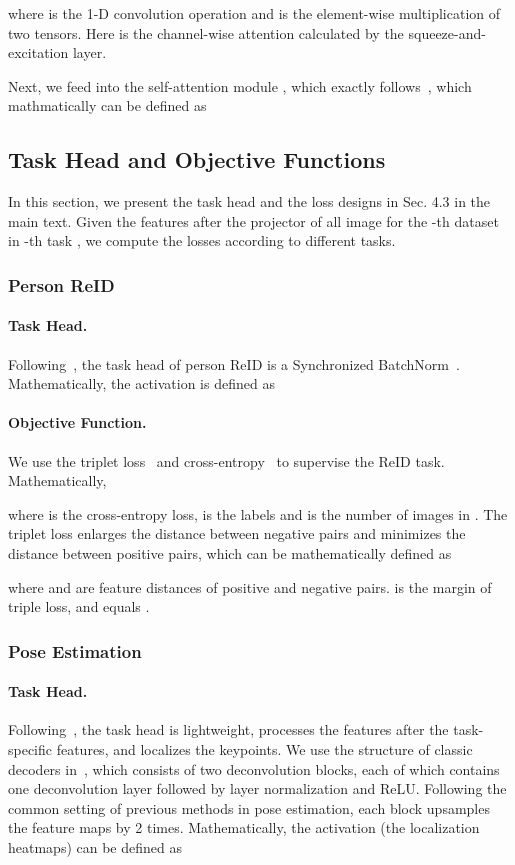 \documentclass[10pt,twocolumn,letterpaper]{article}
\begin{document}
where  is the 1-D convolution operation and  is the element-wise multiplication of two tensors. Here  is the channel-wise attention calculated by the squeeze-and-excitation layer.

Next, we feed  into the self-attention module , which exactly follows~\cite{vaswani2017attention}, which mathmatically can be defined as




\subsection{Task Head and Objective Functions}
In this section, we present the task head and the loss designs in Sec. 4.3 in the main text. Given the features  after the projector of all image  for the -th dataset in -th task , we compute the losses according to different tasks.

\subsubsection{Person ReID}
\paragraph{Task Head.} Following~\cite{luo2019bag}, the task head of person ReID is a Synchronized BatchNorm~\cite{ioffe2015batch}. Mathematically, the activation  is defined as 


\paragraph{Objective Function.} We use the triplet loss~\cite{hermans2017defense} and cross-entropy~\cite{zhang2018generalized} to supervise the ReID task. Mathematically,

where  is the cross-entropy loss,  is the labels and  is the number of images in . The triplet loss enlarges the distance between negative pairs and minimizes the distance between positive pairs, which can be mathematically defined as 

where  and  are feature distances of positive and negative pairs.  is the margin of triple loss, and  equals .

\subsubsection{Pose Estimation}
\paragraph{Task Head.} Following~\cite{xu2022vitpose}, the task head is lightweight, processes the features after the task-specific features, and localizes the keypoints. We use the structure of classic decoders in~\cite{xu2022vitpose}, which consists of two deconvolution blocks, each of which contains one deconvolution layer followed by layer normalization and ReLU. Following the common setting of previous methods in pose estimation, each block upsamples the feature maps by 2 times. Mathematically, the activation (the localization heatmaps) can be defined as
\end{document}
